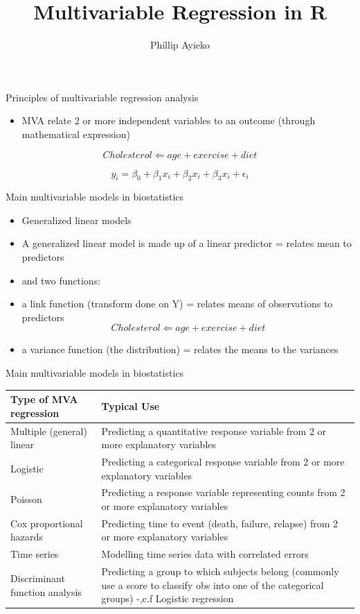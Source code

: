 \documentclass[ignorenonframetext,]{beamer}
\title{Multivariable Regression in R}
\author{Phillip Ayieko}
\date{}
\begin{document}
\frame{\titlepage}

\begin{frame}{Principles of multivariable regression analysis}

\begin{itemize}
\itemsep1pt\parskip0pt
\item
  MVA relate 2 or more independent variables to an outcome (through
  mathematical expression)
\end{itemize}

\[
Cholesterol \Longleftarrow age + exercise + diet
\]

\[
y_i = \beta_0 + \beta_1 x_i + \beta_2 x_i + \beta_3 x_i +  \epsilon_i
\]

\end{frame}

\begin{frame}{Main multivariable models in biostatistics}

\begin{itemize}
\itemsep1pt\parskip0pt
\item
  Generalized linear models
\item
  A generalized linear model is made up of a linear predictor = relates
  mean to predictors
\item
  and two functions:
\item
  a link function (transform done on Y) = relates means of observations
  to predictors \[
  Cholesterol \Longleftarrow age + exercise + diet
  \]
\item
  a variance function (the distribution) = relates the means to the
  variances
\end{itemize}

\end{frame}

\begin{frame}{Main multivariable models in biostatistics}

\begin{longtable}[c]{@{}ll@{}}
\toprule
Type of MVA regression & Typical Use\tabularnewline
\midrule
\endhead
Multiple (general) linear & Predicting a quantitative response variable
from 2 or more explanatory variables\tabularnewline
Logistic & Predicting a categorical response variable from 2 or more
explanatory variables\tabularnewline
Poisson & Predicting a response variable representing counts from 2 or
more explanatory variables\tabularnewline
Cox proportional hazards & Predicting time to event (death, failure,
relapse) from 2 or more explanatory variables\tabularnewline
Time series & Modelling time series data with correlated
errors\tabularnewline
Discriminant function analysis & Predicting a group to which subjects
belong (commonly use a score to classify obs into one of the categorical
groups) -,c.f Logistic regression\tabularnewline
\bottomrule
\end{longtable}

\end{frame}
\end{document}
